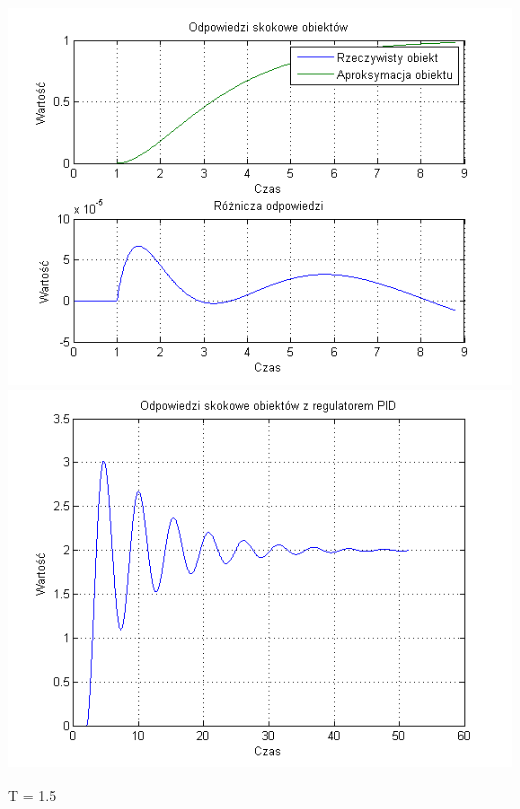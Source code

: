 \documentclass[10pt,a4paper]{article}
\begin{document}
\begin{center}
\includegraphics[scale=1]{images/dwa/skrypt_61.png}\\
\includegraphics[scale=1]{images/dwa/skrypt_62.png}\\
\end{center}
\newpage
T = 1.5
\end{document}
